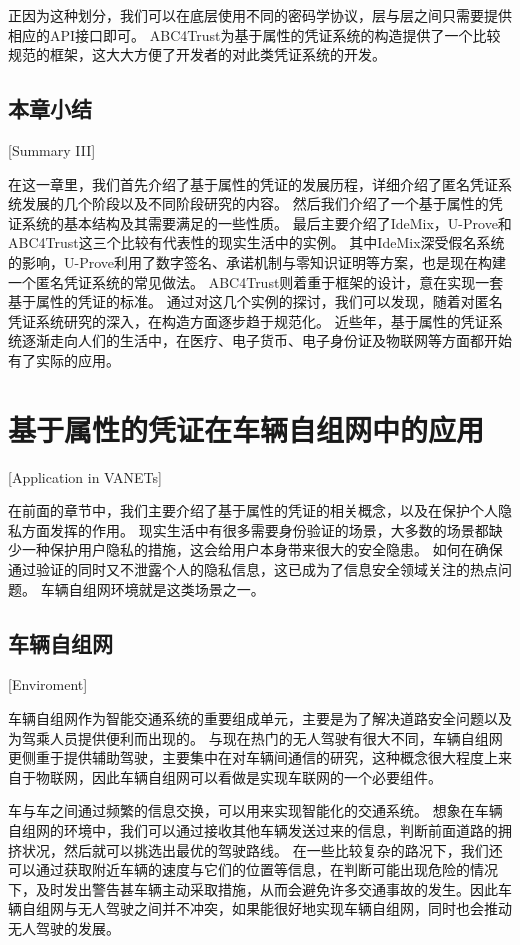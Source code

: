 正因为这种划分，我们可以在底层使用不同的密码学协议，层与层之间只需要提供相应的API接口即可。
ABC4Trust为基于属性的凭证系统的构造提供了一个比较规范的框架，这大大方便了开发者的对此类凭证系统的开发。

\section{本章小结}[Summary III]

在这一章里，我们首先介绍了基于属性的凭证的发展历程，详细介绍了匿名凭证系统发展的几个阶段以及不同阶段研究的内容。
然后我们介绍了一个基于属性的凭证系统的基本结构及其需要满足的一些性质。
最后主要介绍了IdeMix，U-Prove和ABC4Trust这三个比较有代表性的现实生活中的实例。
其中IdeMix深受假名系统的影响，U-Prove利用了数字签名、承诺机制与零知识证明等方案，也是现在构建一个匿名凭证系统的常见做法。
ABC4Trust则着重于框架的设计，意在实现一套基于属性的凭证的标准。
通过对这几个实例的探讨，我们可以发现，随着对匿名凭证系统研究的深入，在构造方面逐步趋于规范化。
近些年，基于属性的凭证系统逐渐走向人们的生活中，在医疗、电子货币、电子身份证及物联网等方面都开始有了实际的应用。

\chapter{基于属性的凭证在车辆自组网中的应用}[Application in VANETs]

在前面的章节中，我们主要介绍了基于属性的凭证的相关概念，以及在保护个人隐私方面发挥的作用。
现实生活中有很多需要身份验证的场景，大多数的场景都缺少一种保护用户隐私的措施，这会给用户本身带来很大的安全隐患。
如何在确保通过验证的同时又不泄露个人的隐私信息，这已成为了信息安全领域关注的热点问题。
车辆自组网环境就是这类场景之一。

\section{车辆自组网}[Enviroment]

车辆自组网作为智能交通系统的重要组成单元，主要是为了解决道路安全问题以及为驾乘人员提供便利而出现的。
与现在热门的无人驾驶有很大不同，车辆自组网更侧重于提供辅助驾驶，主要集中在对车辆间通信的研究，这种概念很大程度上来自于物联网，因此车辆自组网可以看做是实现车联网的一个必要组件。

车与车之间通过频繁的信息交换，可以用来实现智能化的交通系统。
想象在车辆自组网的环境中，我们可以通过接收其他车辆发送过来的信息，判断前面道路的拥挤状况，然后就可以挑选出最优的驾驶路线。
在一些比较复杂的路况下，我们还可以通过获取附近车辆的速度与它们的位置等信息，在判断可能出现危险的情况下，及时发出警告甚车辆主动采取措施，从而会避免许多交通事故的发生。因此车辆自组网与无人驾驶之间并不冲突，如果能很好地实现车辆自组网，同时也会推动无人驾驶的发展。

